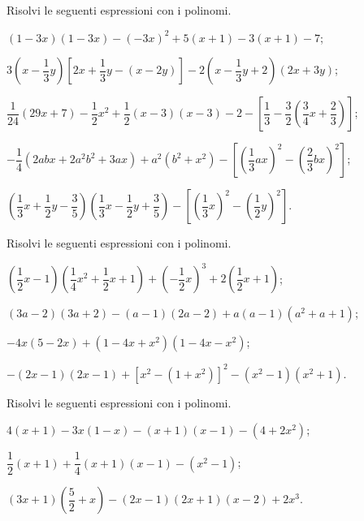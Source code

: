 \begin{esercizio}
Risolvi le seguenti espressioni con i polinomi.
 \begin{enumeratea}
 \item $(1-3x)(1-3x)-(-3x)^{2}+5(x+1)-3(x+1)-7$;
 \item $3\left(x-\dfrac{1}{3}y\right)\left[2x+\dfrac{1}{3}y-(x-2y)\right]-2\left(x-\dfrac{1}{3}y+2\right)(2x+3y)$;
 \item $\dfrac{1}{24}(29x+7)-\dfrac{1}{2}x^{2}+\dfrac{1}{2}(x-3)(x-3)-2-\left[\dfrac{1}{3}-\dfrac{3}{2}\left(\dfrac{3}{4}x+\dfrac{2}{3}\right)\right]$;
 \item $-{\dfrac{1}{4}}\left(2 abx+2a^{2}b^{2}+3 ax\right)+a^{2}(b^{2}+x^{2})-\left[\left(\dfrac{1}{3} ax\right)^{2}-\left(\dfrac{2}{3}bx\right)^{2}\right]$;
 \item $\left(\dfrac{1}{3}x+\dfrac{1}{2}y-\dfrac{3}{5}\right)\left(\dfrac{1}{3}x-\dfrac{1}{2}y+\dfrac{3}{5}\right)-\left[\left(\dfrac{1}{3}x\right)^{2}-\left(\dfrac{1}{2}y\right)^{2}\right]$.
 \end{enumeratea}
\end{esercizio}

\begin{esercizio}
Risolvi le seguenti espressioni con i polinomi.
 \begin{enumeratea}
 \item $\left(\dfrac{1}{2}x-1\right)\left(\dfrac{1}{4}x^{2}+\dfrac{1}{2}x+1\right)+\left(-{\dfrac{1}{2}}x\right)^{3}+2\left(\dfrac{1}{2}x+1\right)$;
 \item $(3a-2)(3a+2)-(a-1)(2a-2)+a(a-1)\left(a^{2}+a+1\right)$;
 \item $-4x(5-2x)+\left(1-4x+x^{2}\right)\left(1-4x-x^{2}\right)$;
 \item $-(2x-1)(2x-1)+\left[x^{2}-\left(1+x^{2}\right)\right]^{2}-\left(x^{2}-1\right)\left(x^{2}+1\right)$.
 \end{enumeratea}
\end{esercizio}

\begin{esercizio}
Risolvi le seguenti espressioni con i polinomi.
 \begin{enumeratea}
 \item $4(x+1)-3x(1-x)-(x+1)(x-1)-\left(4+2x^{2}\right)$;
 \item $\dfrac{1}{2}(x+1)+\dfrac{1}{4}(x+1)(x-1)-\left(x^{2}-1\right)$;
 \item $(3x+1)\left(\dfrac{5}{2}+x\right)-(2x-1)(2x+1)(x-2)+2x^{3}$.
 \end{enumeratea}
\end{esercizio}

